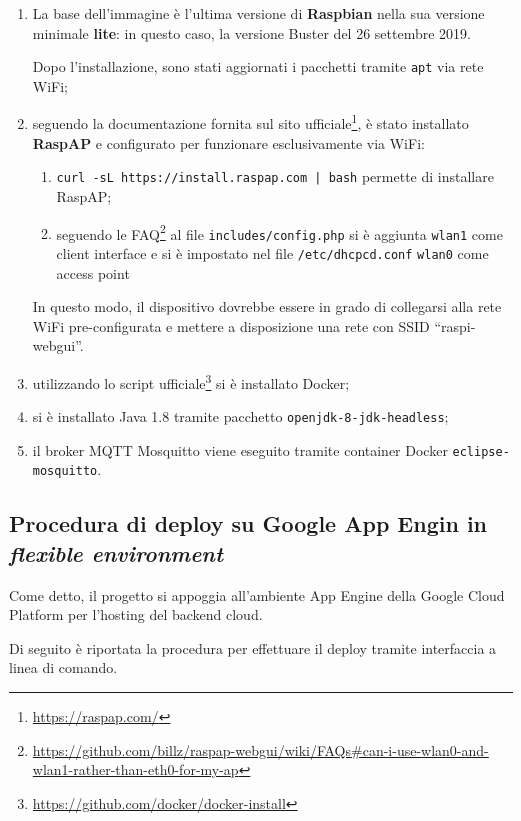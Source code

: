 \begin{enumerate}
  \item
    La base dell'immagine è l'ultima versione di \textbf{Raspbian} nella sua versione minimale \textbf{lite}:
    in questo caso, la versione Buster del 26 settembre 2019.

    Dopo l'installazione, sono stati aggiornati i pacchetti tramite \texttt{apt} via rete WiFi;
  \item
    seguendo la documentazione fornita sul sito ufficiale\footnote{\url{https://raspap.com/}},
    è stato installato \textbf{RaspAP} e configurato per funzionare esclusivamente via WiFi:
    \begin{enumerate}
      \item
        \texttt{curl -sL https://install.raspap.com | bash} permette di installare RaspAP\@;
      \item
        seguendo le FAQ\footnote{\url{https://github.com/billz/raspap-webgui/wiki/FAQs\#can-i-use-wlan0-and-wlan1-rather-than-eth0-for-my-ap}}
        al file \texttt{includes/config.php} si è aggiunta \texttt{wlan1} come client interface e si è impostato nel file \texttt{/etc/dhcpcd.conf}
        \texttt{wlan0} come access point
    \end{enumerate}
    In questo modo, il dispositivo dovrebbe essere in grado di collegarsi alla rete WiFi pre-configurata e mettere a disposizione una rete con SSID ``raspi-webgui''.
  \item
    utilizzando lo script ufficiale\footnote{\url{https://github.com/docker/docker-install}} si è installato Docker;
  \item
    si è installato Java 1.8 tramite pacchetto \texttt{openjdk-8-jdk-headless};
  \item
    il broker MQTT Mosquitto viene eseguito tramite container Docker \texttt{eclipse-mosquitto}.
\end{enumerate}

\subsection{Procedura di deploy su Google App Engin in \emph{flexible environment}}\label{app:gcp}

Come detto, %
il progetto si appoggia all'ambiente App Engine della Google Cloud Platform per l'hosting del backend cloud.

Di seguito è riportata la procedura per effettuare il deploy tramite interfaccia a linea di comando.

